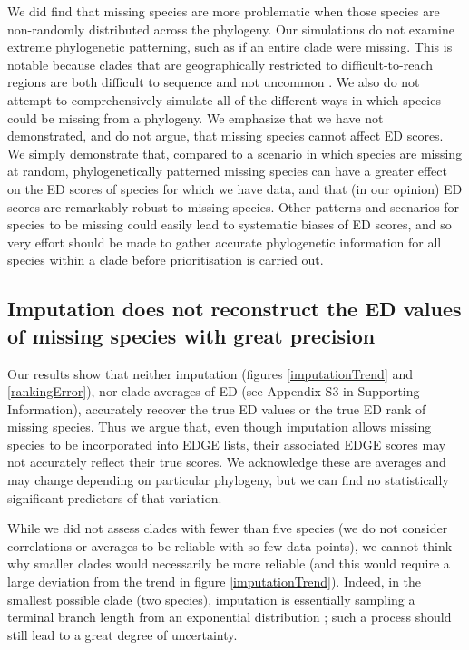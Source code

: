 \documentclass[10pt,english]{article}
\begin{document}
We did find that missing species are more problematic when those species are
non-randomly distributed across the phylogeny. Our simulations do not examine
extreme phylogenetic patterning, such as if an entire clade were missing. This
is notable because clades that are geographically restricted to
difficult-to-reach regions are both difficult to sequence and not uncommon
\autocite[as is seen with 27 coral species in the Indian
Ocean;][]{Arrigoni2012}. We also do not attempt to comprehensively simulate all
of the different ways in which species could be missing from a phylogeny. We
emphasize that we have not demonstrated, and do not argue, that missing species
cannot affect ED scores. We simply demonstrate that, compared to a scenario in
which species are missing at random, phylogenetically patterned missing species
can have a greater effect on the ED scores of species for which we have data,
and that (in our opinion) ED scores are remarkably robust to missing species.
Other patterns and scenarios for species to be missing could easily lead to
systematic biases of ED scores, and so very effort should be made to gather
accurate phylogenetic information for all species within a clade before
prioritisation is carried out.

\subsection*{Imputation does not reconstruct the ED values of missing species with great precision}
Our results show that neither imputation (figures \ref{imputationTrend} and
\ref{rankingError}), nor clade-averages of ED (see Appendix S3 in Supporting
Information), accurately recover the true ED values or the true ED rank of
missing species. Thus we argue that, even though imputation allows missing
species to be incorporated into EDGE lists, their associated EDGE scores may not
accurately reflect their true scores. We acknowledge these are averages and may
change depending on particular phylogeny, but we can find no statistically
significant predictors of that variation.

While we did not assess clades with fewer than five species (we do not consider
correlations or averages to be reliable with so few data-points), we cannot
think why smaller clades would necessarily be more reliable (and this would
require a large deviation from the trend in figure \ref{imputationTrend}).
Indeed, in the smallest possible clade (two species), imputation is essentially
sampling a terminal branch length from an exponential distribution
\autocite{Kuhn2011}; such a process should still lead to a great degree of
uncertainty. 
\end{document}
